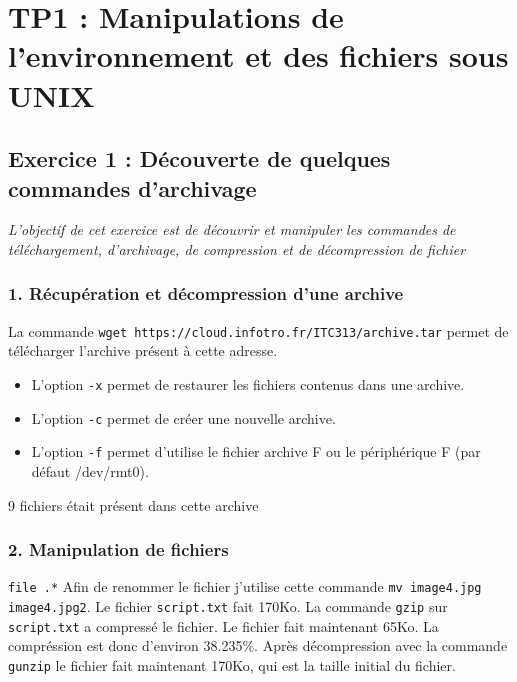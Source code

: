 \chapter{TP1 : Manipulations de l’environnement et des fichiers sous UNIX}
    \section{Exercice 1 : Découverte de quelques commandes d'archivage}
    \textit{L'objectif de cet exercice est de découvrir et manipuler les commandes de téléchargement, d'archivage, de compression et de décompression de fichier}
        \subsection{1. Récupération et décompression d'une archive}
            La commande \texttt{wget https://cloud.infotro.fr/ITC313/archive.tar} permet de télécharger l'archive présent à cette adresse.
            \begin{itemize}
                \item L'option \texttt{-x} permet de restaurer les fichiers contenus dans une archive.
                \item L'option \texttt{-c} permet de créer une nouvelle archive.
                \item L'option \texttt{-f} permet d'utilise le fichier archive F ou le périphérique F (par défaut /dev/rmt0).
            \end{itemize}
            9 fichiers était présent dans cette archive
        \subsection{2. Manipulation de fichiers}
            \texttt{file .\/*}
            Afin de renommer le fichier j'utilise cette commande \texttt{mv image4.jpg image4.jpg2}.
            Le fichier \texttt{script.txt} fait 170Ko.
            La commande \texttt{gzip} sur \texttt{script.txt} a compressé le fichier.
            Le fichier fait maintenant  65Ko.
            La compréssion est donc d'environ 38.235\%.
            Après décompression avec la commande \texttt{gunzip} le fichier fait maintenant 170Ko, qui est la taille initial du fichier.
